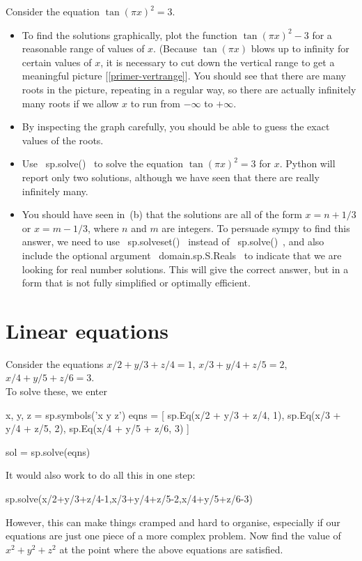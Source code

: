 \documentclass[a4paper,10pt]{amsbook}
\begin{document}
\begin{exercise}
 Consider the equation $\tan(\pi x)^2=3$.  
 \begin{itemize}
  \item[(a)] To find the solutions graphically, plot the
   function $\tan(\pi x)^2-3$ for a reasonable range of
   values of $x$.  (Because $\tan(\pi x)$ blows up to
   infinity for certain values of $x$, it is necessary to cut
   down the vertical range to get a meaningful picture
   [\ref{primer-vertrange}].  You should see that there are many
   roots in the picture, repeating in a regular way, so there
   are actually infinitely many roots if we allow $x$ to run
   from $-\infty$ to $+\infty$.
  \item[(b)] By inspecting the graph carefully, you should be able 
   to guess the exact values of the roots.
  \item[(c)] Use \pcode~sp.solve()~ to solve the equation $\tan(\pi
   x)^2=3$ for $x$.  Python will report only two solutions, although
   we have seen that there are really infinitely many. 
  \item[(d)] You should have seen in~(b) that the solutions are all of
   the form $x=n+1/3$ or $x=m-1/3$, where $n$ and $m$ are integers. 
   To persuade sympy to find this answer, we need to use
   \pcode~sp.solveset()~ instead of \pcode~sp.solve()~, and also
   include the optional argument \pcode~domain.sp.S.Reals~ to indicate
   that we are looking for real number solutions.  This will give the
   correct answer, but in a form that is not fully simplified or
   optimally efficient.
 \end{itemize}
\end{exercise}

\section{Linear equations}
 
\begin{exercise}\label{ex-hilbert-lineq}
 Consider the equations
  $x/2 + y/3 + z/4 = 1$, \hspace{2em}
  $x/3 + y/4 + z/5 = 2$, \hspace{2em}
  $x/4 + y/5 + z/6 = 3$.\\
 To solve these, we enter
\begin{pcodeblock}
   x, y, z = sp.symbols('x y z')
   eqns = [
    sp.Eq(x/2 + y/3 + z/4, 1),
    sp.Eq(x/3 + y/4 + z/5, 2),
    sp.Eq(x/4 + y/5 + z/6, 3)
   ]

   sol = sp.solve(eqns)
\end{pcodeblock}
 It would also work to do all this in one step:
\begin{pcodeblock}
  sp.solve({x/2+y/3+z/4-1,x/3+y/4+z/5-2,x/4+y/5+z/6-3})
\end{pcodeblock}
 However, this can make things cramped and hard to organise,
 especially if our equations are just one piece of a more complex
 problem.  Now find the value of $x^2+y^2+z^2$ at the point where the
 above equations are satisfied.
\end{exercise}
\end{document}
